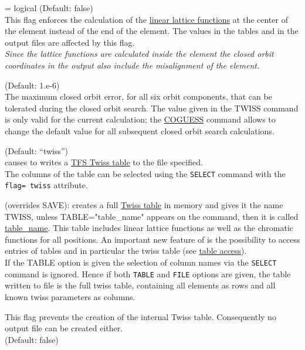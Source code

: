 \begin{madlist}
   = logical (Default: false) \\
  This flag enforces the calculation of the
  \href{../Introduction/tables.html#linear}{linear lattice
    functions} at the center of the element instead of the end
  of the element. The values in the tables and in the output files are
  affected by this flag. \\ 
  \textit{ Since the lattice functions are calculated inside the element
    the closed orbit coordinates in the output also include the misalignment
    of the element.}  

   (Default: 1.e-6) \\
  The maximum closed orbit error, for all six orbit components, 
  that can be tolerated during the closed orbit search. 
  The value given in the TWISS command is only valid for the current calculation; 
  the \href{../control/general.html#coguess}{COGUESS} command allows to 
  change the default value for all subsequent closed orbit search calculations. 

   (Default: ``twiss'') \\
  causes \madx to writes a  \href{../Introduction/select.html#tfs}{TFS Twiss table} 
  to the file specified. \\
  The columns of the table can be selected using the {\tt SELECT}
  command with the {\tt flag= twiss} attribute. 

   (overrides SAVE): \madx creates a full
  \href{../Introduction/tables.html#linear}{Twiss table} in
  memory and gives it the name TWISS, unless TABLE="table\_name"
  appears on the command, then it is called
  \href{../Introduction/label.html}{table\_name}. This table
  includes linear lattice functions as well as the chromatic
  functions for all positions. An important new feature of \madx
  is the possibility to access entries of tables and in
  particular the twiss table (see
  \href{../Introduction/expression.html#table}{table access}).\\
  If the TABLE option is given the selection of column names via the
  {\tt SELECT} command is ignored. Hence if both {\tt TABLE} and
  {\tt FILE} options are given, the table written to file is the full
  twiss table, containing all elements as rows and all known twiss 
  parameters as columns. 

   This flag prevents the creation of the internal Twiss
  table. Consequently no output file can be created either.  \\ 
  (Default: false)
  


\end{madlist}
